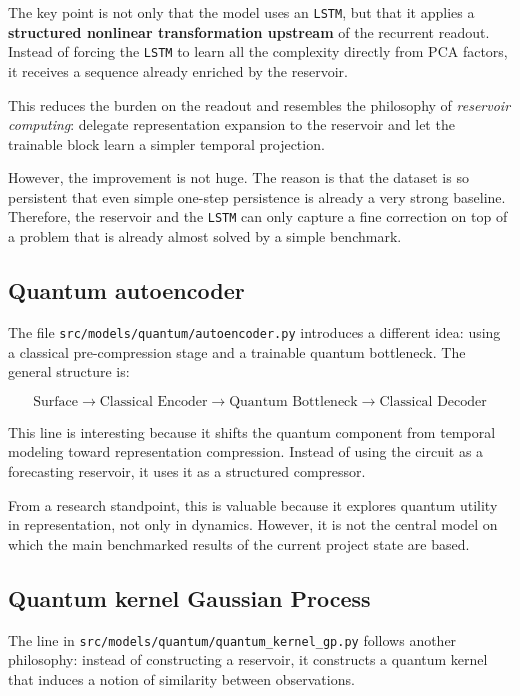 \documentclass[11pt,a4paper]{article}
\begin{document}
The key point is not only that the model uses an \texttt{LSTM}, but that it applies a \textbf{structured nonlinear transformation upstream} of the recurrent readout. Instead of forcing the \texttt{LSTM} to learn all the complexity directly from PCA factors, it receives a sequence already enriched by the reservoir.

This reduces the burden on the readout and resembles the philosophy of \textit{reservoir computing}: delegate representation expansion to the reservoir and let the trainable block learn a simpler temporal projection.

However, the improvement is not huge. The reason is that the dataset is so persistent that even simple one-step persistence is already a very strong baseline. Therefore, the reservoir and the \texttt{LSTM} can only capture a fine correction on top of a problem that is already almost solved by a simple benchmark.

\subsection{Quantum autoencoder}

The file \texttt{src/models/quantum/autoencoder.py} introduces a different idea: using a classical pre-compression stage and a trainable quantum bottleneck. The general structure is:

\[
\text{Surface} \rightarrow \text{Classical Encoder} \rightarrow \text{Quantum Bottleneck} \rightarrow \text{Classical Decoder}
\]

This line is interesting because it shifts the quantum component from temporal modeling toward representation compression. Instead of using the circuit as a forecasting reservoir, it uses it as a structured compressor.

From a research standpoint, this is valuable because it explores quantum utility in representation, not only in dynamics. However, it is not the central model on which the main benchmarked results of the current project state are based.

\subsection{Quantum kernel Gaussian Process}

The line in \texttt{src/models/quantum/quantum\_kernel\_gp.py} follows another philosophy: instead of constructing a reservoir, it constructs a quantum kernel that induces a notion of similarity between observations.
\end{document}
